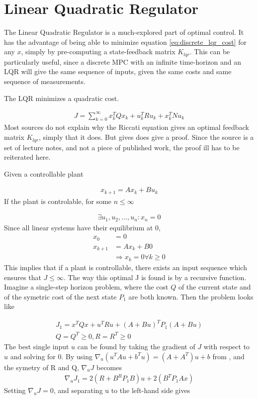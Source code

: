 \chapter{Linear Quadratic Regulator}
\label{cha:LQR}
The Linear Quadratic Regulator is a much-explored part of optimal control. It has the advantage of being able to minimize equation \ref{eq:discrete_lqr_cost} for any $x$, simply by pre-computing a state-feedback matrix $K_{lqr}$. This can be particularly useful, since a discrete MPC with an infinite time-horizon and an LQR will give the same sequence of inputs, given the same costs and same sequence of measurements. 

\noindent
The LQR minimizes a quadratic cost. 

\begin{align}
    J = \sum_{k=0}^\infty x_k^T Q x_k + u_k^T R u_k + x_k^T N u_k 
    \label{eq:discrete_lqr_cost}
\end{align}
Most sources do not explain why the Riccati equation gives an optimal feedback matrix $K_{lqr}$, simply that it does. But \cite{disc_LQR_lecture} gives does give a proof. Since the source is a set of lecture notes, and not a piece of published work, the proof ill has to be reiterated here. 




\noindent
Given a controllable plant 

\begin{align}
    x_{k+1} = A x_k + B u_k
\end{align}
If the plant is controlable, for some $n \le \infty$

\begin{align}
    \exists u_1,u_2, \dots , u_n : x_n = 0
    \label{eq:exists_zeros_sequence}
\end{align}
Since all linear systems have their equilibrium at 0, 
\begin{align}
    x_0 &= 0 \\
    x_{k+1} &= A x_k + B 0\\
    &\Rightarrow x_k =0 \forall k \geq 0
    \label{eq:stable_zero}
\end{align}
This implies that if a plant is controllable, there exists an input sequence which ensures that $J \le \infty$. The way this optimal J is found is by a recursive function. Imagine a single-step horizon problem, where the cost $Q$ of the current state and of the symetric cost of the next state $P_1$ are both known. Then the problem looks like 

\begin{align}
    J_{1} = x^TQ x + u^T R u + (A + Bu)^TP_1(A + Bu) \\
    Q = Q^T \geq 0, R = R^T \ge 0 
\end{align}
The best single input $u$ can be found by taking the gradient of $J$  with respect to $u$ and solving for 0. By using $\nabla_u ( u^TAu + b^Tu) = (A+A^T)u + b$ from \cite{Matrix_cookbook}, and the symetry of R and Q, $\nabla_u J$ becomes
\begin{align}
    \nabla_u J_1  = 2\left( R + B^RP_1 B \right)u + 2\left( B^TP_1 Ax \right)
\end{align}
Setting $\nabla_u J =0$, and separating u to the left-hand side gives 

